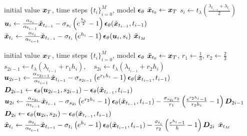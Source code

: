 \begin{algorithm}[H]
    \centering
    \caption{DPM-Solver-2.}\label{alg:dpm-solver-2}
    \begin{algorithmic}[1]
    \Require initial value $\bm{x}_T$, time steps $\{t_i\}_{i=0}^M$, model $\bm{\epsilon}_\theta$
        \State $\tilde{\bm{x}}_{t_0}\gets\bm{x}_T$
        \State $s_{i} \gets t_{\lambda}\left(\frac{\lambda_{t_{i-1}} + \lambda_{t_i}}{2}\right)$
        \State 
    $\bm{u}_{i} \gets \frac{\alpha_{s_i}}{\alpha_{t_{i-1}}} \tilde{\bm{x}}_{t_{i-1}} - \sigma_{s_i}\left(e^{\frac{h_i}{2}} - 1\right)\bm{\epsilon}_\theta(\tilde {\bm{x}}_{t_{i-1}},t_{i-1})$
    \State  $\tilde{\bm{x}}_{t_{i}} \gets \frac{\alpha_{t_{i}}}{\alpha_{t_{i-1}}} \tilde{\bm{x}}_{t_{i-1}} - \sigma_{t_{i}}\left(e^{h_i} - 1\right)\bm{\epsilon}_\theta(\bm{u}_{i},s_i)$
        \EndFor
        \State \Return $\tilde{\bm{x}}_{t_M}$
    \end{algorithmic}
\end{algorithm}
\begin{algorithm}[H]
    \centering
    \caption{DPM-Solver-3.}\label{alg:dpm-solver-3}
    \begin{algorithmic}[1]
    \Require initial value $\bm{x}_T$, time steps $\{t_i\}_{i=0}^M$, model $\bm{\epsilon}_\theta$
    \State $\tilde{\bm{x}}_{t_0}\gets\bm{x}_T$, $r_1\gets\frac{1}{3}$, $r_2\gets\frac{2}{3}$
\State 
$s_{2i-1} \gets t_\lambda\left(\lambda_{t_{i-1}} + r_1 h_i\right),\quad s_{2i} \gets t_\lambda\left(\lambda_{t_{i-1}} + r_2 h_i\right)$ 
\State 
    $\bm{u}_{2i-1} \gets \frac{\alpha_{s_{2i-1}}}{\alpha_{t_{i-1}}} \tilde{\bm{x}}_{t_{i-1}} - \sigma_{s_{2i-1}}\left(e^{r_1 h_i} - 1\right)\bm{\epsilon}_\theta(\tilde {\bm{x}}_{t_{i-1}},t_{i-1})$
\State 
    $\bm{D}_{2i-1} \gets \bm{\epsilon}_\theta(\bm{u}_{2i-1},s_{2i-1}) - \bm{\epsilon}_\theta(\tilde{\bm{x}}_{t_{i-1}},t_{i-1})$
\State
    $\bm{u}_{2i} \gets \frac{\alpha_{s_{2i}}}{\alpha_{t_{i-1}}} \tilde{\bm{x}}_{t_{i-1}} 
    - \sigma_{s_{2i}}\left(e^{r_2 h_i} - 1\right)\bm{\epsilon}_\theta(\tilde{\bm{x}}_{t_{i-1}},t_{i-1}) - \frac{\sigma_{s_{2i}}r_2}{r_1}\left( \frac{e^{r_2 h_i} - 1}{r_2 h_i} - 1\right)\bm{D}_{2i-1}$
\State 
    $\bm{D}_{2i} \gets \bm{\epsilon}_\theta(\bm{u}_{2i},s_{2i}) - \bm{\epsilon}_\theta(\tilde{\bm{x}}_{t_{i-1}},t_{i-1})$
\State $\tilde{\bm{x}}_{t_{i}} \gets \frac{\alpha_{t_{i}}}{\alpha_{t_{i-1}}} \tilde{\bm{x}}_{t_{i-1}}
        - \sigma_{t_{i}}\left(e^{h_i} - 1\right)\bm{\epsilon}_\theta(\tilde{\bm{x}}_{t_{i-1}},t_{i-1}) - \frac{\sigma_{t_{i}}}{r_2}\left( \frac{e^{h_i} - 1}{h} - 1\right)\bm{D}_{2i}$
        \EndFor
        \State  \Return $\tilde{\bm{x}}_{t_M}$
    \end{algorithmic}
\end{algorithm}



